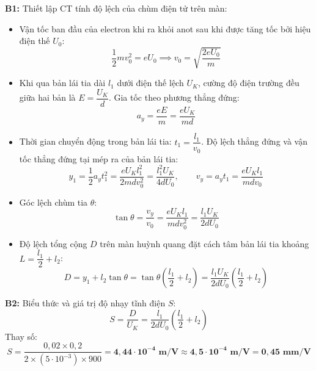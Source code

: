 \documentclass[11pt,a4paper]{article}
\renewcommand{\boldsymbol}[1]{\symbf{#1}}
\begin{document}
\textbf{B1:} Thiết lập CT tính độ lệch của chùm điện tử trên màn:
\begin{itemize}[leftmargin=*, topsep=1pt, itemsep=1pt]
  \item Vận tốc ban đầu của electron khi ra khỏi anot sau khi được tăng tốc bởi hiệu điện thế $U_0$:
  \begin{equation*}
      \frac{1}{2} m v_0^2 = e U_0 \implies v_0 = \sqrt{\frac{2 e U_0}{m}}
  \end{equation*}
  \item Khi qua bản lái tia dài $l_1$ dưới điện thế lệch $U_K$, cường độ điện trường đều giữa hai bản là $E = \dfrac{U_K}{d}$. Gia tốc theo phương thẳng đứng:
  \begin{equation*}
      a_y = \frac{e E}{m} = \frac{e U_K}{m d}
  \end{equation*}
  \item Thời gian chuyển động trong bản lái tia: $t_1 = \dfrac{l_1}{v_0}$. Độ lệch thẳng đứng và vận tốc thẳng đứng tại mép ra của bản lái tia:
  \begin{equation*}
      y_1 = \frac{1}{2} a_y t_1^2 = \frac{e U_K l_1^2}{2 m d v_0^2} = \frac{l_1^2 U_K}{4 d U_0}, \qquad v_y = a_y t_1 = \frac{e U_K l_1}{m d v_0}
  \end{equation*}
  \item Góc lệch chùm tia $\theta$:
  \begin{equation*}
      \tan\theta = \frac{v_y}{v_0} = \frac{e U_K l_1}{m d v_0^2} = \frac{l_1 U_K}{2 d U_0}
  \end{equation*}
  \item Độ lệch tổng cộng $D$ trên màn huỳnh quang đặt cách tâm bản lái tia khoảng $L = \dfrac{l_1}{2} + l_2$:
  \begin{equation*}
      D = y_1 + l_2 \tan\theta = \tan\theta \left(\frac{l_1}{2} + l_2\right) = \frac{l_1 U_K}{2 d U_0}\left(\frac{l_1}{2} + l_2\right)
  \end{equation*}
\end{itemize}

\textbf{B2:} Biểu thức và giá trị độ nhạy tĩnh điện $S$:
\begin{equation*}
    S = \frac{D}{U_K} = \frac{l_1}{2 d U_0}\left(\frac{l_1}{2} + l_2\right)
\end{equation*}
Thay số:
\begin{equation*}
    S = \frac{0{,}02 \times 0{,}2}{2 \times (5 \cdot 10^{-3}) \times 900} = \boldsymbol{4{,}44 \cdot 10^{-4}\text{ m/V}} \approx \boldsymbol{4{,}5 \cdot 10^{-4}\text{ m/V}} = \boldsymbol{0{,}45\text{ mm/V}}
\end{equation*}
\end{document}
